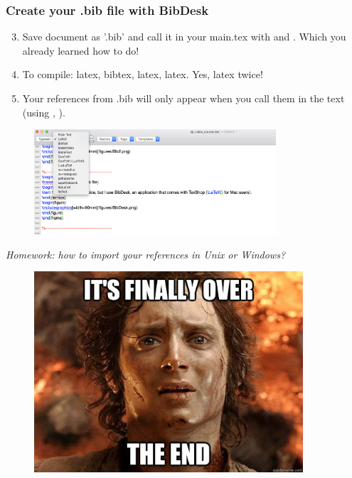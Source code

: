 
\begin{frame}[fragile]
\frametitle{Create your .bib file with BibDesk}
\begin{enumerate}
  \setcounter{enumi}{2}
\item Save document as '.bib' and call it in your main.tex with \color{blue}{\verb||} \color{black}{} and \color{blue}{\verb||} \color{black}{}. Which you already learned how to do! \\
\item To compile: latex, bibtex, latex, latex. Yes, latex twice!
\item Your references from .bib will only appear when you call them in the text (using \color{blue}{\verb|\citep|} \color{black}{}, \color{blue}{\verb|\citet|} \color{black}{}). \\
\end{enumerate}
\begin{figure}
\includegraphics[width=90mm]{figures/compile.png}
\end{figure}
\vspace{0.5cm}
\textit{Homework: how to import your references in Unix or Windows?}
\end{frame}

\begin{frame}
\begin{figure}
\includegraphics[width=100mm]{figures/Frodo.jpeg}
\end{figure}
\end{frame}





